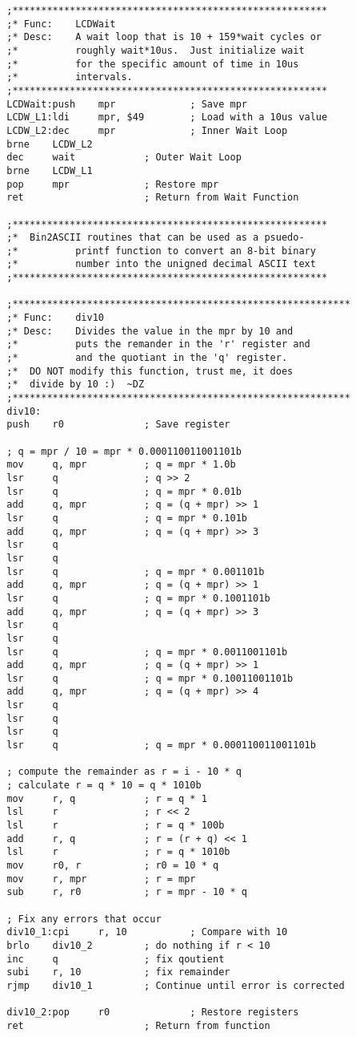 \documentclass[12pt,letterpaper]{article}
\begin{document}
\begin{verbatim}
	    ;*******************************************************
	    ;* Func:	LCDWait
	    ;* Desc:	A wait loop that is 10 + 159*wait cycles or
	    ;*			roughly wait*10us.  Just initialize wait
	    ;*			for the specific amount of time in 10us 
	    ;*			intervals.
	    ;*******************************************************
	    LCDWait:push	mpr				; Save mpr
	    LCDW_L1:ldi		mpr, $49		; Load with a 10us value
	    LCDW_L2:dec		mpr				; Inner Wait Loop
	    brne	LCDW_L2
	    dec		wait			; Outer Wait Loop
	    brne	LCDW_L1
	    pop		mpr				; Restore mpr
	    ret						; Return from Wait Function
	    
	    ;*******************************************************
	    ;*	Bin2ASCII routines that can be used as a psuedo-
	    ;*			printf function to convert an 8-bit binary
	    ;*			number into the unigned decimal ASCII text
	    ;*******************************************************
	    
	    ;***********************************************************
	    ;* Func:	div10
	    ;* Desc:	Divides the value in the mpr by 10 and 
	    ;*			puts the remander in the 'r' register and
	    ;*			and the quotiant in the 'q' register.
	    ;*	DO NOT modify this function, trust me, it does
	    ;*	divide by 10 :)  ~DZ		
	    ;***********************************************************
	    div10:
	    push	r0				; Save register
	    
	    ; q = mpr / 10 = mpr * 0.000110011001101b
	    mov		q, mpr			; q = mpr * 1.0b
	    lsr		q				; q >> 2
	    lsr		q				; q = mpr * 0.01b
	    add		q, mpr			; q = (q + mpr) >> 1
	    lsr		q				; q = mpr * 0.101b
	    add		q, mpr			; q = (q + mpr) >> 3
	    lsr		q
	    lsr		q
	    lsr		q				; q = mpr * 0.001101b
	    add		q, mpr			; q = (q + mpr) >> 1
	    lsr		q				; q = mpr * 0.1001101b
	    add		q, mpr			; q = (q + mpr) >> 3
	    lsr		q				
	    lsr		q
	    lsr		q				; q = mpr * 0.0011001101b
	    add		q, mpr			; q = (q + mpr) >> 1
	    lsr		q				; q = mpr * 0.10011001101b
	    add		q, mpr			; q = (q + mpr) >> 4
	    lsr		q
	    lsr		q
	    lsr		q
	    lsr		q				; q = mpr * 0.000110011001101b
	    
	    ; compute the remainder as r = i - 10 * q
	    ; calculate r = q * 10 = q * 1010b
	    mov		r, q			; r = q * 1
	    lsl		r				; r << 2
	    lsl		r				; r = q * 100b
	    add		r, q			; r = (r + q) << 1
	    lsl		r				; r = q * 1010b
	    mov		r0, r			; r0 = 10 * q
	    mov		r, mpr			; r = mpr
	    sub		r, r0			; r = mpr - 10 * q
	    
	    ; Fix any errors that occur
	    div10_1:cpi		r, 10			; Compare with 10
	    brlo	div10_2			; do nothing if r < 10
	    inc		q				; fix qoutient
	    subi	r, 10			; fix remainder
	    rjmp	div10_1			; Continue until error is corrected
	    
	    div10_2:pop		r0				; Restore registers
	    ret						; Return from function
    \end{verbatim}
\end{document}
